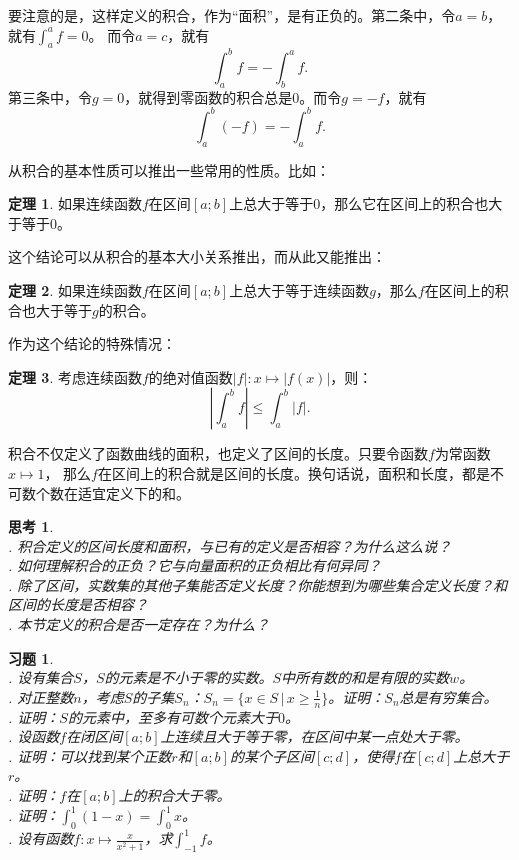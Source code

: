 \documentclass[12pt,UTF8]{ctexbook}
\theoremstyle{definition}
\newtheorem{tm}{定理}[section]
\theoremstyle{plain}
\newtheorem{sk}{思考}[section]
\newtheorem{xt}{习题}[section]
\begin{document}
要注意的是，这样定义的积合，作为“面积”，是有正负的。第二条中，令$a=b$，就有$\int_a^a f = 0$。
而令$a = c$，就有
$$\int_a^b f = - \int_b^a f.$$
第三条中，令$g=0$，就得到零函数的积合总是$0$。而令$g = -f$，就有
$$\int_a^b (-f) = -\int_a^b f. $$

从积合的基本性质可以推出一些常用的性质。比如：

\begin{tm}
    如果连续函数$f$在区间$[a; b]$上总大于等于$0$，那么它在区间上的积合也大于等于$0$。
\end{tm}

这个结论可以从积合的基本大小关系推出，而从此又能推出：

\begin{tm}
    如果连续函数$f$在区间$[a; b]$上总大于等于连续函数$g$，那么$f$在区间上的积合也大于等于$g$的积合。
\end{tm}

作为这个结论的特殊情况：

\begin{tm}
    考虑连续函数$f$的绝对值函数$|f|: x\mapsto |f(x)|$，则：
    $$ \left| \int_a^b f \right| \leqslant \int_a^b |f|. $$

\end{tm}

积合不仅定义了函数曲线的面积，也定义了区间的长度。只要令函数$f$为常函数$x\mapsto 1$，
那么$f$在区间上的积合就是区间的长度。换句话说，面积和长度，都是不可数个数在适宜定义下的和。

\begin{sk}
    \mbox{} \\
    . 积合定义的区间长度和面积，与已有的定义是否相容？为什么这么说？\\
    . 如何理解积合的正负？它与向量面积的正负相比有何异同？\\
    . 除了区间，实数集的其他子集能否定义长度？你能想到为哪些集合定义长度？和区间的长度是否相容？\\
    . 本节定义的积合是否一定存在？为什么？
\end{sk}

\begin{xt}
    \mbox{} \\
    . 设有集合$S$，$S$的元素是不小于零的实数。$S$中所有数的和是有限的实数$w$。\\
    . 对正整数$n$，考虑$S$的子集$S_n$：$S_n = \{x\in S \, | \, x \geqslant \frac{1}{n}\}$。证明：$S_n$总是有穷集合。\\
    . 证明：$S$的元素中，至多有可数个元素大于$0$。\\
    . 设函数$f$在闭区间$[a; b]$上连续且大于等于零，在区间中某一点处大于零。\\
    . 证明：可以找到某个正数$r$和$[a; b]$的某个子区间$[c;d]$，使得$f$在$[c;d]$上总大于$r$。\\
    . 证明：$f$在$[a; b]$上的积合大于零。\\
    . 证明：$\int_0^1 (1 - x) = \int_0^1 x$。\\
    . 设有函数$f: x\mapsto \frac{x}{x^2+1}$，求$\int_{-1}^1 f$。\\
\end{xt}
\end{document}
